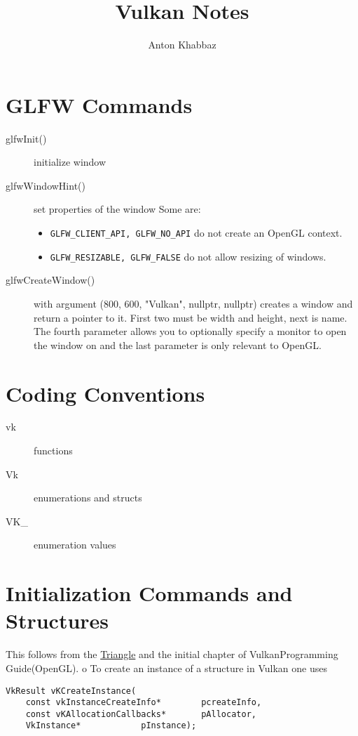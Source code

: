 \documentclass{article}
\title{Vulkan Notes}
\author{Anton Khabbaz}
\begin{document}
\maketitle
\section{GLFW Commands}
\begin{description}
\item[ glfwInit()] initialize window
\item[glfwWindowHint()] set properties of the window Some are:
	\begin{itemize}
		\item \verb|GLFW_CLIENT_API, GLFW_NO_API| do not create an
OpenGL context.
		\item \verb|GLFW_RESIZABLE, GLFW_FALSE| do not allow resizing of
windows.
	\end{itemize}
\item [glfwCreateWindow()] with argument 
 (800, 600, "Vulkan", nullptr, nullptr) creates a window
and return a pointer to it.  First two must be width and height, next is name.
The fourth parameter allows you to optionally specify a monitor to open the
window on and the last parameter is only relevant to OpenGL.	
\end{description}
\section{Coding Conventions}
\begin{description}
\item[vk] functions
\item[Vk] enumerations and structs
\item[VK\_] enumeration values
\end{description}
\section{Initialization Commands and Structures}
This follows from the
\href{https://vulkan-tutorial.com/en/Drawing\_a\_triangle/Setup/Instance}{Triangle}
and the initial chapter of VulkanProgramming Guide(OpenGL).  
o
To create an instance of a structure in Vulkan one uses
\begin{verbatim}
VkResult vKCreateInstance( 
	const vkInstanceCreateInfo*        pcreateInfo,
	const vKAllocationCallbacks*       pAllocator,
	VkInstance*			   pInstance);
\end{verbatim}
\end{document}
